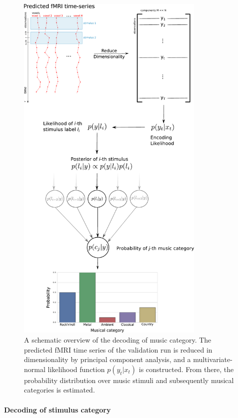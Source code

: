\begin{figure}
  \centering
  \includegraphics[width=9cm]{pics/Decoding_scheme}

  \caption{A schematic overview of the decoding of music category. The predicted
  f{MRI} time series of the validation run is reduced in dimensionality by
  principal component analysis,
  and a multivariate-normal likelihood function $p(y_{t}|x_{t})$ is constructed.
  From there, the probability distribution over music stimuli and subsequently musical categories is estimated.}

 \label{fig:decoding_scheme}
\end{figure}


\paragraph{Decoding of stimulus category}

